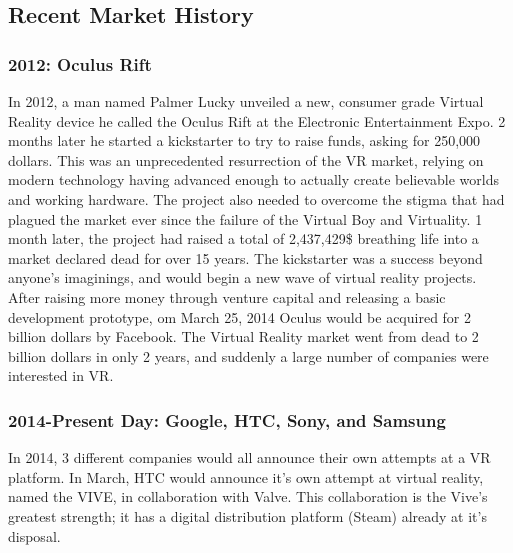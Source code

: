 \documentclass[a4paper,10pt]{article}
\begin{document}
\pagebreak

\subsection{Recent Market History}

\subsubsection{2012: Oculus Rift}

In 2012, a man named Palmer Lucky unveiled a new, consumer grade Virtual Reality device he called the Oculus Rift at the Electronic Entertainment Expo.  2 months later he started a kickstarter to try to raise funds, asking for 250,000 dollars.  This was an unprecedented resurrection of the VR market, relying on modern technology having advanced enough to actually create believable worlds and working hardware.  The project also needed to overcome the stigma that had plagued the market ever since the failure of the Virtual Boy and Virtuality.  1 month later, the project had raised a total of 2,437,429\$ breathing life into a market declared dead for over 15 years.  The kickstarter was a success beyond anyone's imaginings, and would begin a new wave of virtual reality projects.  After raising more money through venture capital and releasing a basic development prototype, om March 25, 2014 Oculus would be acquired for 2 billion dollars by Facebook.  The Virtual Reality market went from dead to 2 billion dollars in only 2 years, and suddenly a large number of companies were interested in VR.

\subsubsection{2014-Present Day: Google, HTC, Sony, and Samsung}

In 2014, 3 different companies would all announce their own attempts at a VR platform.  In March, HTC would announce it's own attempt at virtual reality, named the VIVE, in collaboration with Valve.  This collaboration is the Vive's greatest strength; it has a digital distribution platform (Steam) already at it's disposal.  
\end{document}

